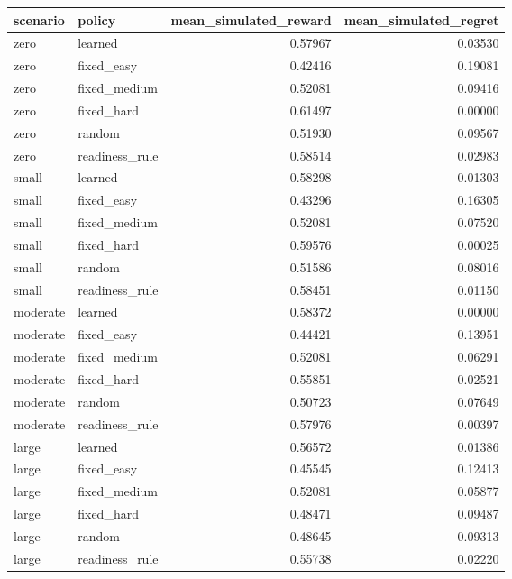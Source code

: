 \begin{tabular}{llrr}
\toprule
scenario & policy & mean\_simulated\_reward & mean\_simulated\_regret \\
\midrule
zero & learned & 0.57967 & 0.03530 \\
zero & fixed\_easy & 0.42416 & 0.19081 \\
zero & fixed\_medium & 0.52081 & 0.09416 \\
zero & fixed\_hard & 0.61497 & 0.00000 \\
zero & random & 0.51930 & 0.09567 \\
zero & readiness\_rule & 0.58514 & 0.02983 \\
small & learned & 0.58298 & 0.01303 \\
small & fixed\_easy & 0.43296 & 0.16305 \\
small & fixed\_medium & 0.52081 & 0.07520 \\
small & fixed\_hard & 0.59576 & 0.00025 \\
small & random & 0.51586 & 0.08016 \\
small & readiness\_rule & 0.58451 & 0.01150 \\
moderate & learned & 0.58372 & 0.00000 \\
moderate & fixed\_easy & 0.44421 & 0.13951 \\
moderate & fixed\_medium & 0.52081 & 0.06291 \\
moderate & fixed\_hard & 0.55851 & 0.02521 \\
moderate & random & 0.50723 & 0.07649 \\
moderate & readiness\_rule & 0.57976 & 0.00397 \\
large & learned & 0.56572 & 0.01386 \\
large & fixed\_easy & 0.45545 & 0.12413 \\
large & fixed\_medium & 0.52081 & 0.05877 \\
large & fixed\_hard & 0.48471 & 0.09487 \\
large & random & 0.48645 & 0.09313 \\
large & readiness\_rule & 0.55738 & 0.02220 \\
\bottomrule
\end{tabular}
